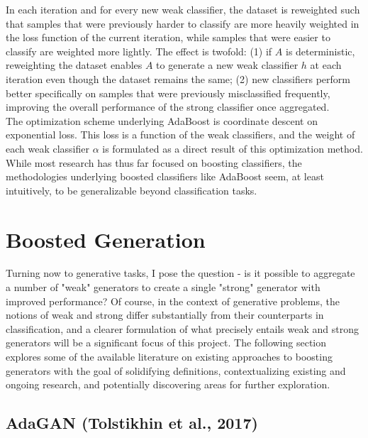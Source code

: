 \documentclass[12pt, reqno]{amsart}
\begin{document}
In each iteration and for every new weak classifier, the dataset is reweighted such that samples that were previously harder to classify are more heavily weighted in the loss function of the current iteration, while samples that were easier to classify are weighted more lightly. The effect is twofold: (1) if $A$ is deterministic, reweighting the dataset enables $A$ to generate a new weak classifier $h$ at each iteration even though the dataset remains the same; (2) new classifiers perform better specifically on samples that were previously misclassified frequently, improving the overall performance of the strong classifier once aggregated. \\

The optimization scheme underlying AdaBoost is coordinate descent on exponential loss. This loss is a function of the weak classifiers, and the weight of each weak classifier $\alpha$ is formulated as a direct result of this optimization method. \\

While most research has thus far focused on boosting classifiers, the methodologies underlying boosted classifiers like AdaBoost seem, at least intuitively, to be generalizable beyond classification tasks. \\

\section*{Boosted Generation}

Turning now to generative tasks, I pose the question - is it possible to aggregate a number of "weak" generators to create a single "strong" generator with improved performance? Of course, in the context of generative problems, the notions of weak and strong differ substantially from their counterparts in classification, and a clearer formulation of what precisely entails weak and strong generators will be a significant focus of this project. The following section explores some of the available literature on existing approaches to boosting generators with the goal of solidifying definitions, contextualizing existing and ongoing research, and potentially discovering areas for further exploration. \\

\subsection*{AdaGAN (Tolstikhin et al., 2017)}
\end{document}
